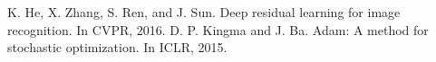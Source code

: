  K. He, X. Zhang, S. Ren, and J. Sun. Deep residual learning for image recognition. In CVPR, 2016.
 D. P. Kingma and J. Ba. Adam: A method for stochastic optimization. In ICLR, 2015.
